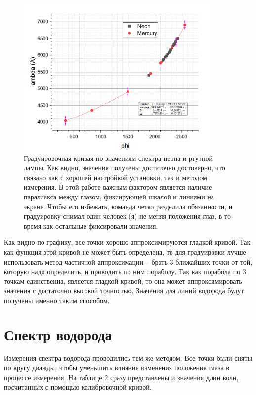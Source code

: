 \documentclass[a4paper, 14pt]{extarticle}%
\newcommand\ECaption[1]{%
     \captionsetup{font=footnotesize}%
     \caption{#1}}
\begin{document}
\begin{figure}[h!]
\begin{center}
\includegraphics[width=0.9\textwidth]{gr1}
\end{center}
\ECaption{Градуировочная кривая по значениям спектра неона и ртутной лампы. Как видно, значения получены достаточно достоверно, что связано как с хорошей настройкой установки, так и методом измерения. В этой работе важным фактором является наличие параллакса между глазом, фиксирующей шкалой и линиями на экране. Чтобы его избежать, команда четко разделила обязанности, и градуировку снимал один человек (я) не меняя положения глаз, в то время как остальные фиксировали значения.}
\end{figure}

Как видно по графику, все точки хорошо аппроксимируются гладкой кривой. Так как функция этой кривой не может быть определена, то для градуировки лучше использовать метод частичной аппроксимации -- брать 3 ближайших точки от той, которую надо определить, и проводить по ним пораболу. Так как порабола по 3 точкам единственна, является гладкой кривой, то она может аппроксимировать значения с достаточно высокой точностью. Значения для линий водорода будут получены именно таким способом.

\newpage

\newpage
 
\section*{Спектр водорода}

Измерения спектра водорода проводились тем же методом. Все точки были сняты по кругу дважды, чтобы уменьшить влияние изменения положения глаза в процессе измерения. На таблице 2 сразу представлены и значения длин волн, посчитанных с помощью калибровочной кривой.
\end{document}
